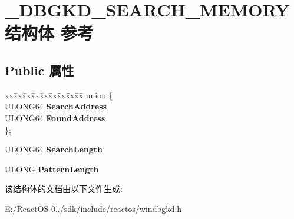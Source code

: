 \hypertarget{struct___d_b_g_k_d___s_e_a_r_c_h___m_e_m_o_r_y}{}\section{\+\_\+\+D\+B\+G\+K\+D\+\_\+\+S\+E\+A\+R\+C\+H\+\_\+\+M\+E\+M\+O\+R\+Y结构体 参考}
\label{struct___d_b_g_k_d___s_e_a_r_c_h___m_e_m_o_r_y}
\subsection*{Public 属性}
\begin{DoxyCompactItemize}
\item 
\mbox{\label{struct___d_b_g_k_d___s_e_a_r_c_h___m_e_m_o_r_y_a6d1b169389b467433fdfeac08067441e}} 
\begin{tabbing}
xx\=xx\=xx\=xx\=xx\=xx\=xx\=xx\=xx\=\kill
union \{\\
\>ULONG64 {\bfseries SearchAddress}\\
\>ULONG64 {\bfseries FoundAddress}\\
\}; \\

\end{tabbing}\item 
\mbox{\label{struct___d_b_g_k_d___s_e_a_r_c_h___m_e_m_o_r_y_a7b2f458b6d9bca763437b246146df419}} 
U\+L\+O\+N\+G64 {\bfseries Search\+Length}
\item 
\mbox{\label{struct___d_b_g_k_d___s_e_a_r_c_h___m_e_m_o_r_y_aeb546e0b21680dabc798391ee052c665}} 
U\+L\+O\+NG {\bfseries Pattern\+Length}
\end{DoxyCompactItemize}


该结构体的文档由以下文件生成\+:\begin{DoxyCompactItemize}
\item 
E\+:/\+React\+O\+S-\/0../sdk/include/reactos/windbgkd.\+h\end{DoxyCompactItemize}
